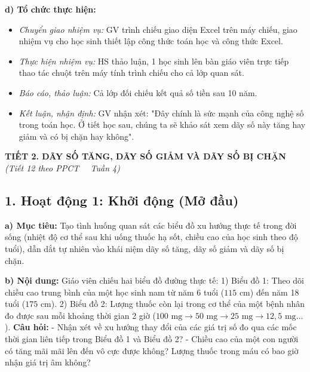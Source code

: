 \documentclass[12pt, a4paper]{article}
\begin{document}
\noindent \textbf{d) Tổ chức thực hiện:}  
\begin{itemize}[leftmargin=0.8cm]  
    \item \textit{Chuyển giao nhiệm vụ:} GV trình chiếu giao diện Excel trên máy chiếu, giao nhiệm vụ cho học sinh thiết lập công thức toán học và công thức Excel.  
    \item \textit{Thực hiện nhiệm vụ:} HS thảo luận, 1 học sinh lên bàn giáo viên trực tiếp thao tác chuột trên máy tính trình chiếu cho cả lớp quan sát.  
    \item \textit{Báo cáo, thảo luận:} Cả lớp đối chiếu kết quả số tiền sau 10 năm.  
    \item \textit{Kết luận, nhận định:} GV nhận xét: "Đây chính là sức mạnh của công nghệ số trong toán học. Ở tiết học sau, chúng ta sẽ khảo sát xem dãy số này tăng hay giảm và có bị chặn hay không".  
\end{itemize}  
  
\vspace{10pt}  
\begin{center}  
    {\fontsize{13pt}{16pt}\selectfont \textbf{TIẾT 2. DÃY SỐ TĂNG, DÃY SỐ GIẢM VÀ DÃY SỐ BỊ CHẶN}}\\[2pt]  
    \textit{(Tiết 12 theo PPCT \ \textbar \ Tuần 4)}  
\end{center}  
  
\subsection*{1. Hoạt động 1: Khởi động (Mở đầu)}  
  
\noindent \textbf{a) Mục tiêu:}  
Tạo tình huống quan sát các biểu đồ xu hướng thực tế trong đời sống (nhiệt độ cơ thể sau khi uống thuốc hạ sốt, chiều cao của học sinh theo độ tuổi), dẫn dắt tự nhiên vào khái niệm dãy số tăng, dãy số giảm và dãy số bị chặn.  
  
\noindent \textbf{b) Nội dung:}  
Giáo viên chiếu hai biểu đồ đường thực tế:  
1) Biểu đồ 1: Theo dõi chiều cao trung bình của một học sinh nam từ năm 6 tuổi ($115\text{ cm}$) đến năm 18 tuổi ($175\text{ cm}$).  
2) Biểu đồ 2: Lượng thuốc còn lại trong cơ thể của một bệnh nhân đo được sau mỗi khoảng thời gian 2 giờ ($100\text{ mg} \to 50\text{ mg} \to 25\text{ mg} \to 12{,}5\text{ mg} \dots$).  
\textbf{Câu hỏi:}  
- Nhận xét về xu hướng thay đổi của các giá trị số đo qua các mốc thời gian liên tiếp trong Biểu đồ 1 và Biểu đồ 2?  
- Chiều cao của một con người có tăng mãi mãi lên đến vô cực được không? Lượng thuốc trong máu có bao giờ nhận giá trị âm không?  
  
\end{document}
